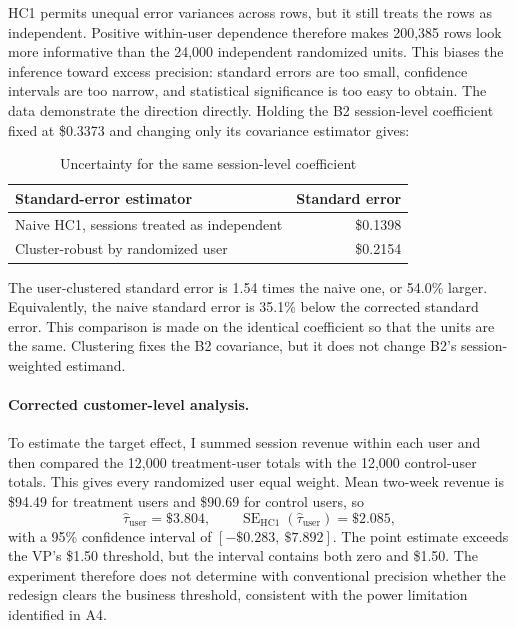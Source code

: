 \documentclass[11pt]{article}
\begin{document}
HC1 permits unequal error variances across rows, but it still treats the rows
as independent. Positive within-user dependence therefore makes 200,385 rows
look more informative than the 24,000 independent randomized units. This
biases the inference toward excess precision: standard errors are too small,
confidence intervals are too narrow, and statistical significance is too
easy to obtain. The data demonstrate the direction directly. Holding the B2
session-level coefficient fixed at \$0.3373 and changing only its covariance
estimator gives:

\begin{table}[ht]
    \centering
    \caption{Uncertainty for the same session-level coefficient}
    \label{tab:se-comparison}
    \begin{tabular}{lr}
        \toprule
        Standard-error estimator & Standard error \\
        \midrule
        Naive HC1, sessions treated as independent & \$0.1398 \\
        Cluster-robust by randomized user           & \$0.2154 \\
        \bottomrule
    \end{tabular}
\end{table}

The user-clustered standard error is 1.54 times the naive one, or 54.0\%
larger. Equivalently, the naive standard error is 35.1\% below the corrected
standard error. This comparison is made on the identical coefficient so that
the units are the same. Clustering fixes the B2 covariance, but it does not
change B2's session-weighted estimand.

\paragraph{Corrected customer-level analysis.}
To estimate the target effect, I summed session revenue within each user and
then compared the 12,000 treatment-user totals with the 12,000 control-user
totals. This gives every randomized user equal weight. Mean two-week revenue
is \$94.49 for treatment users and \$90.69 for control users, so
\[
    \widehat{\tau}_{\mathrm{user}}=\$3.804,
    \qquad
    \operatorname{SE}_{\mathrm{HC1}}(\widehat{\tau}_{\mathrm{user}})=\$2.085,
\]
with a 95\% confidence interval of $[-\$0.283,\ \$7.892]$. The point estimate
exceeds the VP's \$1.50 threshold, but the interval contains both zero and
\$1.50. The experiment therefore does not determine with conventional
precision whether the redesign clears the business threshold, consistent
with the power limitation identified in A4.
\end{document}
